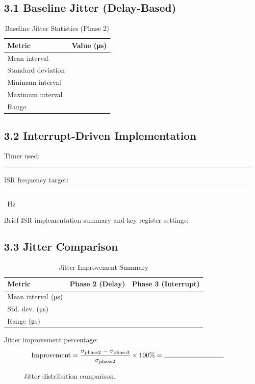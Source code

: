 \documentclass[11pt,letterpaper]{article}
\newcommand{\shortblank}{\rule{1.2in}{0.4pt}}
\newcommand{\answerbox}[1]{\fbox{\parbox[c][#1][t]{\linewidth}{}}}
\begin{document}
\subsection*{3.1 Baseline Jitter (Delay-Based)}
\begin{table}[H]
\centering
\caption{Baseline Jitter Statistics (Phase 2)}
\begin{tabular}{@{}lc@{}}
\toprule
Metric & Value (\si{\micro\second}) \\
\midrule
Mean interval & \\
Standard deviation & \\
Minimum interval & \\
Maximum interval & \\
Range & \\
\bottomrule
\end{tabular}
\end{table}

\subsection*{3.2 Interrupt-Driven Implementation}
Timer used: \shortblank \hfill ISR frequency target: \shortblank\ Hz

Brief ISR implementation summary and key register settings:
\answerbox{1.0in}

\subsection*{3.3 Jitter Comparison}
\begin{table}[H]
\centering
\caption{Jitter Improvement Summary}
\begin{tabular}{@{}lcc@{}}
\toprule
Metric & Phase 2 (Delay) & Phase 3 (Interrupt) \\
\midrule
Mean interval (\si{\micro\second}) & & \\
Std. dev. (\si{\micro\second}) & & \\
Range (\si{\micro\second}) & & \\
\bottomrule
\end{tabular}
\end{table}

Jitter improvement percentage:
\[
\text{Improvement} = \frac{\sigma_{\text{phase2}} - \sigma_{\text{phase3}}}{\sigma_{\text{phase2}}}\times 100\% = \text{\shortblank}
\]

\begin{figure}[H]
    \centering
    \caption{Jitter distribution comparison.}
\end{figure}
\end{document}
